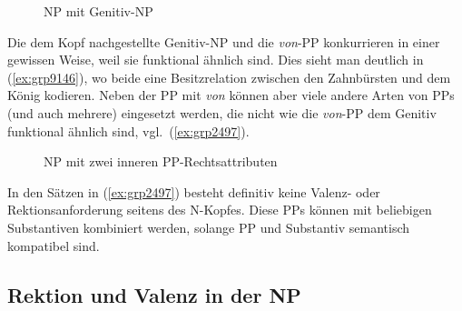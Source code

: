 \begin{figure}
  \centering
  \caption{NP mit Genitiv-NP}
  \label{fig:ngrmitngr}
\end{figure}


Die dem Kopf nachgestellte Genitiv-NP und die \textit{von}-PP konkurrieren in einer gewissen Weise, weil sie funktional ähnlich sind.
Dies sieht man deutlich in (\ref{ex:grp9146}), wo beide eine Besitzrelation zwischen den Zahnbürsten und dem König kodieren.
Neben der PP mit \textit{von} können aber viele andere Arten von PPs (und auch mehrere) eingesetzt werden, die nicht wie die \textit{von}-PP dem Genitiv funktional ähnlich sind, vgl.\ (\ref{ex:grp2497}).

\begin{exe}
  \ex\label{ex:grp2497}
  \begin{xlist}
  \end{xlist}
\end{exe}

\begin{figure}
  \centering
  \caption{NP mit zwei inneren PP-Rechtsattributen}
  \label{fig:grp2497c}
\end{figure}

In den Sätzen in (\ref{ex:grp2497}) besteht definitiv keine Valenz- oder Rektionsanforderung seitens des N-Kopfes.
Diese PPs können mit beliebigen Substantiven kombiniert werden, solange PP und Substantiv semantisch kompatibel sind.

\subsection{Rektion und Valenz in der NP}

